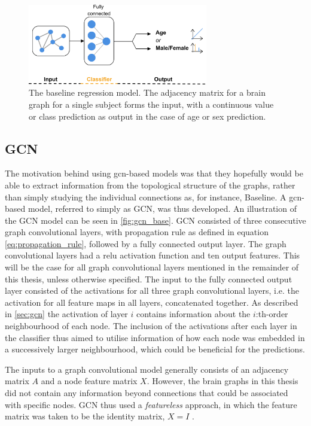 \begin{figure}[!htbp]
    \centering
    \includegraphics[width=0.7\textwidth]{chapters/images_methods/ffnn_v2.png}
    \caption{The baseline regression model. The adjacency matrix for a brain graph for a single subject forms the input, with a continuous value or class prediction as output in the case of age or sex prediction.}
    \label{fig:Graph_class_baseline}
\end{figure}

\subsection{GCN}

The motivation behind using \acrshort{gcn}-based models was that they hopefully would be able to extract information from the topological structure of the graphs, rather than simply studying the individual connections as, for instance, Baseline. A \acrshort{gcn}-based model, referred to simply as GCN, was thus developed. An illustration of the GCN model can be seen in \cref{fig:gcn_base}. GCN consisted of three consecutive graph convolutional layers, with propagation rule as defined in equation \eqref{eq:propagation_rule}, followed by a fully connected output layer. The graph convolutional layers had a \acrfull{relu} activation function and ten output features. This will be the case for all graph convolutional layers mentioned in the remainder of this thesis, unless otherwise specified. The input to the fully connected output layer consisted of the activations for all three graph convolutional layers, i.e. the activation for all feature maps in all layers, concatenated together. As described in \cref{sec:gcn} the activation of layer $i$ contains information about the $i$:th-order neighbourhood of each node. The inclusion of the activations after each layer in the classifier thus aimed to utilise information of how each node was embedded in a successively larger neighbourhood, which could be beneficial for the predictions.

The inputs to a graph convolutional model generally consists of an adjacency matrix $A$ and a node feature matrix $X$. However, the brain graphs in this thesis did not contain any information beyond connections that could be associated with specific nodes. GCN thus used a \textit{featureless} approach, in which the feature matrix was taken to be the identity matrix, $X=I$ \cite{kipf_vae}.

